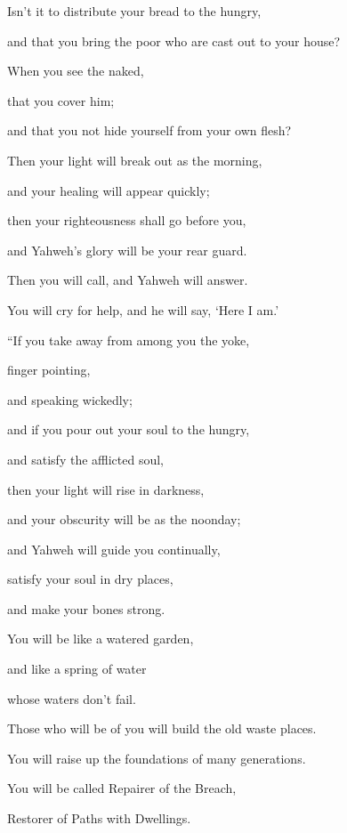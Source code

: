 {\par }{\Q {}Isn’t it to distribute your bread to the hungry,
\par }{\QB and that you bring the poor who are cast out to your house?
\par }{\Q When you see the naked,
\par }{\QB that you cover him;
\par }{\QB and that you not hide yourself from your own flesh?
\par }{\Q {}Then your light will break out as the morning,
\par }{\QB and your healing will appear quickly;
\par }{\Q then your righteousness shall go before you,
\par }{\QB and Yahweh’s glory will be your rear guard.
\par }{\Q {}Then you will call, and Yahweh will answer.
\par }{\QB You will cry for help, and he will say, ‘Here I am.’
\par }{\BB \par }{\Q “If you take away from among you the yoke,
\par }{\QB finger pointing,
\par }{\QB and speaking wickedly;
\par }{\Q {}and if you pour out your soul to the hungry,
\par }{\QB and satisfy the afflicted soul,
\par }{\Q then your light will rise in darkness,
\par }{\QB and your obscurity will be as the noonday;
\par }{\Q {}and Yahweh will guide you continually,
\par }{\QB satisfy your soul in dry places,
\par }{\QB and make your bones strong.
\par }{\Q You will be like a watered garden,
\par }{\QB and like a spring of water
\par }{\QB whose waters don’t fail.
\par }{\Q {}Those who will be of you will build the old waste places.
\par }{\QB You will raise up the foundations of many generations.
\par }{\Q You will be called Repairer of the Breach,
\par }{\QB Restorer of Paths with Dwellings.
}
